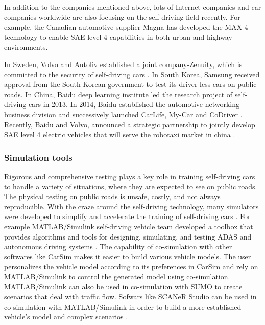 In addition to the companies mentioned above, lots of Internet companies and car companies worldwide are also focusing on the self-driving field recently. For example, the Canadian automotive supplier Magna has developed the MAX 4 technology to enable SAE level 4 capabilities in both urban and highway environments.   


In Sweden, Volvo and Autoliv established a joint company-Zenuity, which is committed to the security of self-driving cars \cite{Coelingh2018DrivingTF}. In South Korea, Samsung received approval from the South Korean government to test its driver-less cars on public roads. In China, Baidu deep learning institute led the research project of self-driving cars in 2013. In 2014, Baidu established the automotive networking business division and successively launched CarLife, My-Car and CoDriver \cite{Toschi}.  Recently, Baidu and Volvo, announced a strategic partnership to jointly develop SAE level 4 electric vehicles that will serve the robotaxi market in china \cite{Synopsys}.



\subsubsection{Simulation tools}
\label{sec:SCANeR-studio}
Rigorous and comprehensive testing plays a key role in training self-driving cars to handle a variety of situations, where they are expected to see on public roads. The physical testing on public roads is unsafe, costly, and not always reproducible. With the craze around the self-driving technology, many simulators were developed to simplify and accelerate the training of self-driving cars \cite{kaur2021survey}. For example MATLAB/Simulink self-driving vehicle team developed a toolbox that provides algorithms and tools for  designing, simulating, and testing ADAS and autonomous driving systems \cite{Matlab}. The capability of co-simulation with other softwares like CarSim \cite{CarSim} makes it easier to build various vehicle models. The user personalizes the vehicle model according to its preferences in CarSim and rely on MATLAB/Simulink to control the generated model using co-simulation. MATLAB/Simulink can also be used in co-simulation with SUMO \cite{Sumo} to create scenarios that deal with traffic flow. Sofwars like SCANeR Studio can be used in co-simulation with MATLAB/Simulink in order to build a more established vehicle's model and complex scenarios \cite{SCANeR}. 


